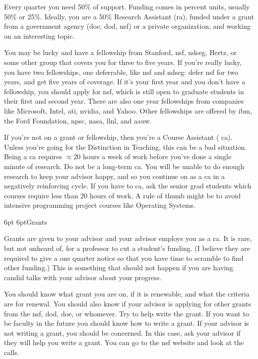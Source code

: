 \documentclass[10pt]{book}
\makeatletter
\renewcommand{\subsection}{\@startsection{subsection}{2}{0mm}%
   {6pt}%
   {6pt}{\normalfont\normalsize\itshape}}
\makeatother
\begin{document}
Every quarter you need 50\% of support. Funding comes in percent units,
usually 50\% or 25\%. Ideally, you are a 50\% Research Assistant ({\sc ra}),
funded under a grant from a government agency ({\sc doe}, {\sc dod}, {\sc nsf})
or a private organization, and working on an interesting topic.

You may be lucky and have a fellowship from Stanford, {\sc nsf}, {\sc ndseg},
Hertz, or some other group that covers you for three to five years. If you're
really lucky, you have two fellowships, one deferrable, like {\sc nsf} and {\sc
ndseg}: defer {\sc nsf} for two years, and get five years of coverage. If it's your
first year and you don't have a fellowship, you should apply for {\sc nsf},
which is still open to graduate students in their first and second year. There are
also one year fellowships from companies like Microsoft, Intel, {\sc ati},
{\sc nvidia}, and Yahoo.  Other fellowships are offered by {\sc ibm}, the Ford
Foundation, {\sc npsc}, {\sc nasa}, {\sc llnl}, and {\sc aauw}.

If you're not on a grant or fellowship, then you're a Course Assistant ({\sc
ca}). Unless you're going for the Distinction in
Teaching, this can be a bad situation. Being a {\sc ca} requires $\approx 20$
hours a week of work before you've done a single minute of research. Do not be
a long-term {\sc ca}. You will be unable to do enough research 
to keep your advisor happy, and so you continue on as a {\sc ca}
in a negatively reinforcing cycle.  If you have to {\sc ca}, ask the senior
grad students which courses require less than 20 hours
of work. A rule of thumb might be to avoid intensive programming project
courses like Operating Systems.

\subsection{Grants}

Grants are given to your advisor and your advisor employs you as a {\sc ra}. It is
rare, but not unheard of, for a professor to cut a student's funding.
(I believe they are required to give a one quarter notice so that you
have time to scramble to find other funding.) This is something that should not
happen if you are having candid talks with your advisor about your
progress.

You should know what grant you are on, if it is renewable, and what the
criteria are for renewal. You should also know if your advisor is applying for
other grants from the {\sc nsf}, {\sc dod}, {\sc doe}, or whomever. Try to
help write the grant. If you want to be faculty in the future you
should know how to write a grant. If your advisor is not writing a
grant, you should be concerned. In this case, ask your advisor if they will
help you write a grant.  You can go to the {\sc nsf} website and look at the calls.
\end{document}
